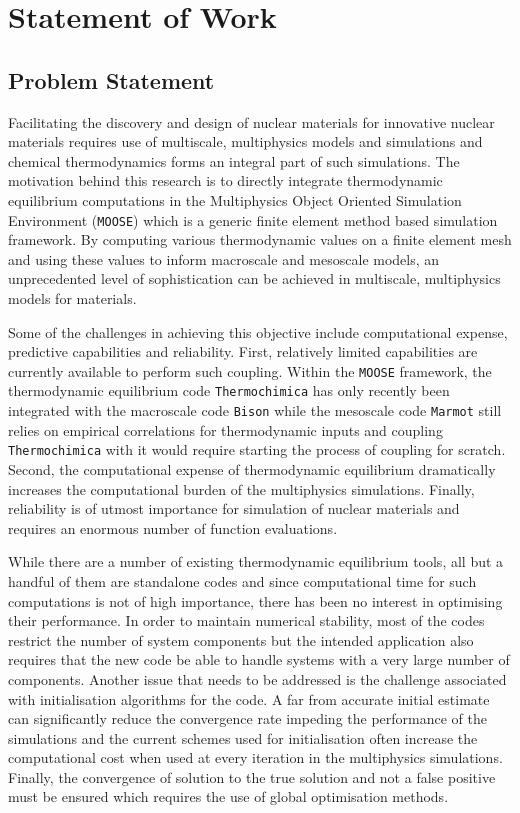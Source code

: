 \chapter{Statement of Work} \label{chap:overview}

	\section{Problem Statement}

	Facilitating the discovery and design of nuclear materials for innovative nuclear materials requires use of multiscale, multiphysics models and simulations and chemical thermodynamics forms an integral part of such simulations. The motivation behind this research is to directly integrate thermodynamic equilibrium computations in the Multiphysics Object Oriented Simulation Environment (\texttt{MOOSE}) which is a generic finite element method based simulation framework. By computing various thermodynamic values on a finite element mesh and using these values to inform macroscale and mesoscale models, an unprecedented level of sophistication can be achieved in multiscale, multiphysics models for materials.

	Some of the challenges in achieving this objective include computational expense, predictive capabilities and reliability. First, relatively limited capabilities are currently available to perform such coupling. Within the \texttt{MOOSE} framework, the thermodynamic equilibrium code \texttt{Thermochimica} has only recently been integrated with the macroscale code \texttt{Bison} while the mesoscale code \texttt{Marmot} still relies on empirical correlations for thermodynamic inputs and coupling \texttt{Thermochimica} with it would require starting the process of coupling for scratch.  Second, the computational expense of thermodynamic equilibrium dramatically increases the computational burden of the multiphysics simulations. Finally, reliability is of utmost importance for simulation of nuclear materials and requires an enormous number of function evaluations.

	While there are a number of existing thermodynamic equilibrium tools, all but a handful of them are standalone codes and since computational time for such computations is not of high importance, there has been no interest in optimising their performance. In order to maintain numerical stability, most of the codes restrict the number of system components but the intended application also requires that the new code be able to handle systems with a very large number of components. Another issue that needs to be addressed is the challenge associated with initialisation algorithms for the code. A far from accurate initial estimate can significantly reduce the convergence rate impeding the performance of the simulations and the current schemes used for initialisation often increase the computational cost when used at every iteration in the multiphysics simulations. Finally, the convergence of solution to the true solution and not a false positive must be ensured which requires the use of global optimisation methods.

